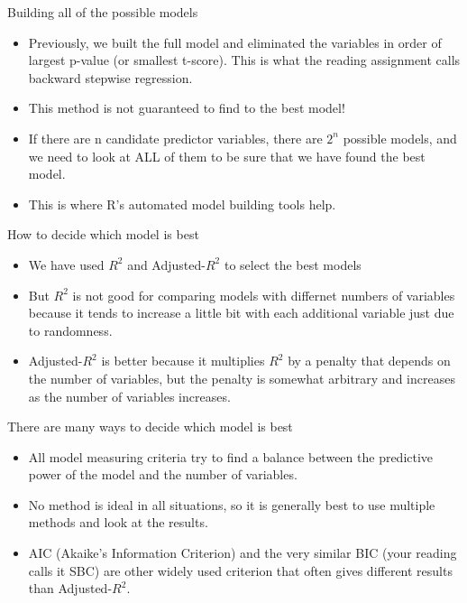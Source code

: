 \documentclass{beamer}\usepackage[]{graphicx}\usepackage[]{color}
\begin{document}
\begin{darkframes}
    \begin{frame}[fragile]{Building all of the possible models}
      \begin{itemize}[<+->]
        \item Previously, we built the full model and eliminated the variables in order of largest p-value (or smallest t-score). This is what the reading assignment calls backward stepwise regression.
        \item This method is not guaranteed to find to the best model!
        \item If there are n candidate predictor variables, there are $2^n$ possible models, and we need to look at ALL of them to be sure that we have found the best model.
        \item This is where R's automated model building tools help.
      \end{itemize} 
    \end{frame}

    \begin{frame}[fragile]{How to decide which model is best}
      \begin{itemize}[<+->]
        \item We have used $R^2$ and Adjusted-$R^2$ to select the best models
        \item But $R^2$ is not good for comparing models with differnet numbers of variables because it tends to increase a little bit with each additional variable just due to randomness.
        \item Adjusted-$R^2$ is better because it multiplies $R^2$ by a penalty that depends on the number of variables, but the penalty is somewhat arbitrary and increases as the number of variables increases.
      \end{itemize} 
    \end{frame}


    \begin{frame}[fragile]{There are many ways to decide which model is best}
      \begin{itemize}[<+->]
        \item All model measuring criteria try to find a balance between the predictive power of the model and the number of variables.
        \item No method is ideal in all situations, so it is generally best to use multiple methods and look at the results.
        \item AIC (Akaike’s Information Criterion) and the very similar BIC (your reading calls it SBC) are other widely used criterion that often gives different results than Adjusted-$R^2$.
      \end{itemize} 


\end{frame}
\end{darkframes}
\end{document}
